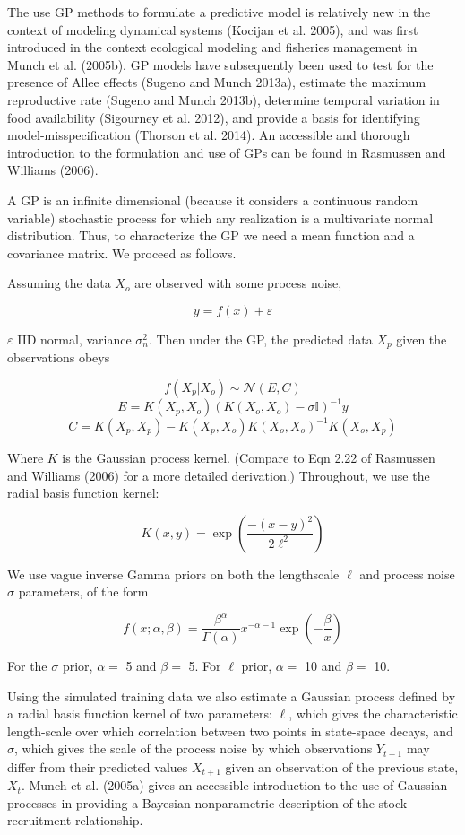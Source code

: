 \documentclass[author-year, 12pt,review]{elsarticle} %
\begin{document}
The use GP methods to formulate a predictive model is relatively new in
the context of modeling dynamical systems (Kocijan et al. 2005), and was
first introduced in the context ecological modeling and fisheries
management in Munch et al. (2005b). GP models have subsequently been
used to test for the presence of Allee effects (Sugeno and Munch 2013a),
estimate the maximum reproductive rate (Sugeno and Munch 2013b),
determine temporal variation in food availability (Sigourney et al.
2012), and provide a basis for identifying model-misspecification
(Thorson et al. 2014). An accessible and thorough introduction to the
formulation and use of GPs can be found in Rasmussen and Williams
(2006).

A GP is an infinite dimensional (because it considers a continuous
random variable) stochastic process for which any realization is a
multivariate normal distribution. Thus, to characterize the GP we need a
mean function and a covariance matrix. We proceed as follows.

Assuming the data $X_o$ are observed with some process noise,

\[y = f(x) + \varepsilon\]

$\varepsilon$ IID normal, variance $\sigma_n^2$. Then under the GP, the
predicted data $X_p$ given the observations obeys

\[f(X_p|X_o) \sim \mathcal{N}(E,C)\]
\[E = K(X_p, X_o) \left(K(X_o,X_o) - \sigma \mathbb{I} \right)  ^{-1} y\]
\[C = K(X_p, X_p) - K(X_p, X_o) K(X_o,X_o)^{-1} K(X_o, X_p)\]

Where $K$ is the Gaussian process kernel. (Compare to Eqn 2.22 of
Rasmussen and Williams (2006) for a more detailed derivation.)
Throughout, we use the radial basis function kernel:

\[ K(x,y) = \exp\left(\frac{-(x-y)^2}{2 \ell^2} \right)\]

We use vague inverse Gamma priors on both the lengthscale $\ell$ and
process noise $\sigma$ parameters, of the form

\[f(x; \alpha, \beta) = \frac{\beta^\alpha}{\Gamma(\alpha)} x^{-\alpha - 1}\exp\left(-\frac{\beta}{x}\right)\]

For the $\sigma$ prior, $\alpha = $ 5 and $\beta = $ 5. For $\ell$
prior, $\alpha = $ 10 and $\beta = $ 10.

Using the simulated training data we also estimate a Gaussian process
defined by a radial basis function kernel of two parameters: $\ell$,
which gives the characteristic length-scale over which correlation
between two points in state-space decays, and $\sigma$, which gives the
scale of the process noise by which observations $Y_{t+1}$ may differ
from their predicted values $X_{t+1}$ given an observation of the
previous state, $X_t$. Munch et al. (2005a) gives an accessible
introduction to the use of Gaussian processes in providing a Bayesian
nonparametric description of the stock-recruitment relationship.
\end{document}
